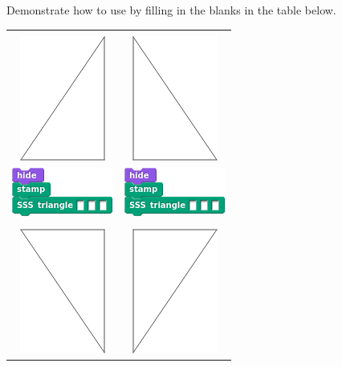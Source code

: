 \documentclass[noauthor,nooutcomes,12pt,hints,handout]{ximera}
\begin{document}
\begin{question}%
  Demonstrate how to use  by filling in the
  blanks in the table below.
  \begin{center}
    \begin{tabular}{|c||c|}\hline
      &  \\
      \includegraphics{EgStageII.png} & \includegraphics{EgStageI.png} \\
      \includegraphics{SSSstampBlank.png} & \includegraphics{SSSstampBlank.png} \\
      \hline\hline
      &  \\
      \includegraphics{EgStageIII.png} & \includegraphics{EgStageIV.png} \\

\end{tabular}
\end{center}
\end{question}
\end{document}
